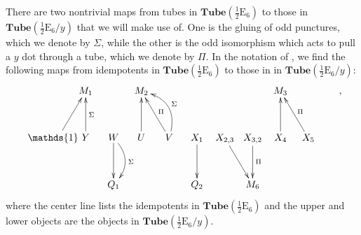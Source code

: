 \documentclass[12pt,a4paper]{article}
\newcommand{\tube}{\textbf{Tube}}
\newcommand{\halfesix}{\frac{1}{2}\text{E}_6}
\begin{document}
There are two nontrivial maps from tubes in $\tube(\halfesix)$ to those in $\tube(\halfesix / y)$ that we will make use of. 
One is the gluing of odd punctures, which we denote by $\Sigma$, while 
the other is the odd isomorphism which acts to pull a $y$ dot through a tube, which we denote by $\Pi$. 
In the notation of \cite{Hong2008}, we find the following maps from idempotents in $\tube(\halfesix)$ to those in in $\tube(\halfesix / y)$:
\begin{align}
\xymatrix @!0 @M=1mm @C=10mm{
& &M_1 && M_2 && &&& M_3 &&  \\
 \\
 \quad&\mathds{1} \ar[ruu] \quad & Y \ar[uu]_{\Sigma} & W\ar[dd] \ar@/^1pc/[dd]^{\Sigma} & U\ar[uu] & V \ar[uul]_\Pi \ar@/_1.3pc/[uul]_\Sigma & X_1 \ar[dd] & X_{2,3}\ar[ddr] &X_{3,2} \ar[dd]^\Pi& X_4\ar[uu] & X_5\ar[uul]_\Pi &  \\
\\
&&&Q_1& &&Q_2 &&M_6& &&  \\
},
\end{align}
where the center line lists the idempotents in $\tube(\halfesix)$ and the upper and lower objects are the objects in $\tube(\halfesix / y)$.
\end{document}
